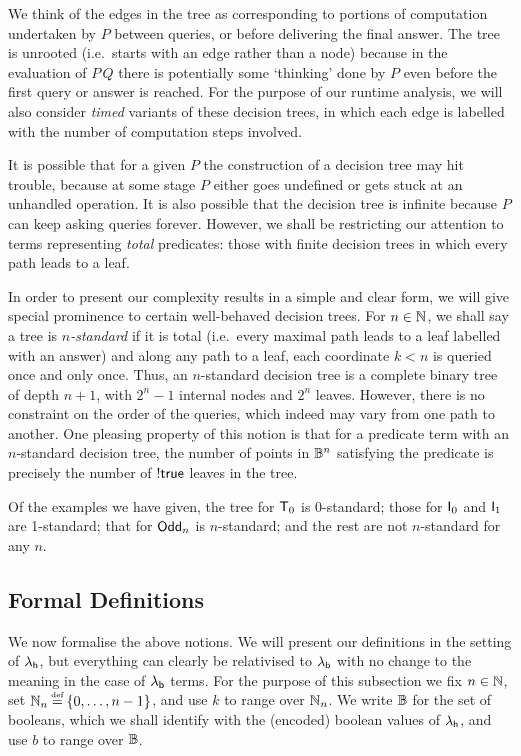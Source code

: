 \documentclass[12pt,phd,lfcs,twoside,openright,logo,leftchapter,normalheadings]{infthesis}
\theoremstyle{plain}
\theoremstyle{definition}
\begin{document}
We think of the edges in the tree as corresponding to portions of
computation undertaken by $P$ between queries, or before delivering
the final answer.  The tree is unrooted (i.e.\ starts with an edge
rather than a node) because in the evaluation of $P\,Q$ there is
potentially some `thinking' done by $P$ even before the first query or
answer is reached.  For the purpose of our runtime analysis, we will
also consider \emph{timed} variants of these decision trees, in which
each edge is labelled with the number of computation steps involved.

It is possible that for a given $P$ the construction of a decision
tree may hit trouble, because at some stage $P$ either goes undefined
or gets stuck at an unhandled operation.  It is also possible that the
decision tree is infinite because $P$ can keep asking queries forever.
However, we shall be restricting our attention to terms representing
\emph{total} predicates: those with finite decision trees in which
every path leads to a leaf.

In order to present our complexity results in a simple and clear form,
we will give special prominence to certain well-behaved decision
trees.  For $n \in \mathbb{N}$, we shall say a tree is \emph{$n$-standard} if
it is total (i.e.\ every maximal path leads to a leaf labelled with an
answer) and along any path to a leaf, each coordinate $k<n$ is queried
once and only once. Thus, an $n$-standard decision tree is a complete
binary tree of depth $n+1$, with $2^n - 1$ internal nodes and $2^n$
leaves.  However, there is no constraint on the order of the queries,
which indeed may vary from one path to another.  One pleasing property
of this notion is that for a predicate term with an $n$-standard
decision tree, the number of points in $\mathbb{B}^n$ satisfying the predicate
is precisely the number of $\mathord{!} \mathsf{true}$ leaves in the tree.

Of the examples we have given, the tree for $\mathsf{T}_0$ is 0-standard;
those for $\mathsf{I}_0$ and $\mathsf{I}_1$ are 1-standard; that for
$\mathsf{Odd}_n$ is $n$-standard; and the rest are not $n$-standard for
any $n$.

\subsection{Formal Definitions}
\label{sec:predicate-models}
We now formalise the above notions.  We will present our definitions
in the setting of $\lambda_{\mathsf{h}}$, but everything can clearly be relativised
to $\lambda_{\mathsf{b}}$ with no change to the meaning in the case of $\lambda_{\mathsf{b}}$
terms.  For the purpose of this subsection we fix $n \in \mathbb{N}$, set
$\N_n \defas \{0,\ldots,n-1\}$, and use $k$ to range over $\mathbb{N}_n$. We
write $\mathbb{B}$ for the set of booleans, which we shall identify with the
(encoded) boolean values of $\lambda_{\mathsf{h}}$, and use $b$ to range over $\mathbb{B}$.
\end{document}
